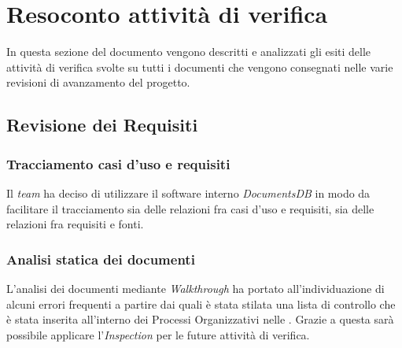 \newpage
\section{Resoconto attività di verifica}
In questa sezione del documento vengono descritti e analizzati gli esiti delle attività di verifica svolte su tutti i documenti che vengono consegnati nelle varie revisioni di avanzamento del progetto.

\subsection{Revisione dei Requisiti}

\subsubsection{Tracciamento casi d'uso e requisiti}
Il \textit{team} ha deciso di utilizzare il software interno \textit{DocumentsDB} in modo da facilitare il tracciamento sia delle relazioni fra casi d'uso e requisiti, sia delle relazioni fra requisiti e fonti.

\subsubsection{Analisi statica dei documenti}
L'analisi dei documenti mediante \textit{Walkthrough} ha portato all'individuazione di alcuni errori frequenti a partire dai quali è stata stilata una lista di controllo che è stata inserita all'interno dei Processi Organizzativi nelle \textit{\NdP}. Grazie a questa sarà possibile applicare l'\textit{Inspection} per le future attività di verifica.

